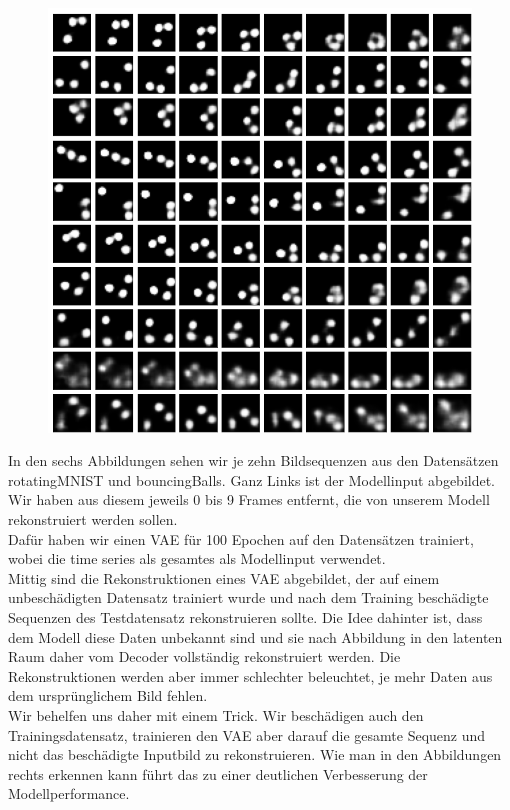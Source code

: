 \documentclass[12pt]{article}
\begin{document}
\begin{figure}[h!]
\begin{minipage}{0.32\textwidth}
	\end{minipage}
	\begin{minipage}{0.32\textwidth}
		\includegraphics[scale=0.22]{bouncingBalls_VAElat2}
	\end{minipage}
	\end{figure}
	In den sechs Abbildungen sehen wir je zehn Bildsequenzen aus den Datensätzen rotatingMNIST und bouncingBalls. 
	Ganz Links ist der Modellinput abgebildet. Wir haben aus diesem jeweils 0 bis 9 Frames entfernt, die von unserem Modell rekonstruiert werden sollen.\\
	Dafür haben wir einen VAE für 100 Epochen auf den Datensätzen trainiert, wobei die time series als gesamtes als Modellinput verwendet.\\
	Mittig sind die Rekonstruktionen eines VAE abgebildet, der auf einem unbeschädigten Datensatz trainiert wurde und nach dem Training beschädigte Sequenzen des Testdatensatz rekonstruieren sollte. Die Idee dahinter ist, dass dem Modell diese Daten unbekannt sind und sie nach Abbildung in den latenten Raum daher vom Decoder vollständig rekonstruiert werden.
	Die Rekonstruktionen werden aber immer schlechter beleuchtet, je mehr Daten aus dem ursprünglichem Bild fehlen. \\
	Wir behelfen uns daher mit einem Trick. Wir beschädigen auch den Trainingsdatensatz, trainieren den VAE aber darauf die gesamte Sequenz und nicht das beschädigte Inputbild zu rekonstruieren. Wie man in den Abbildungen rechts erkennen kann führt das zu einer deutlichen Verbesserung der Modellperformance.\\
\end{document}
